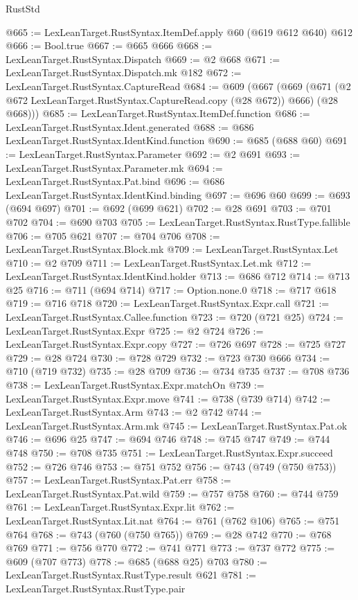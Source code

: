 \begin{lexlean}{RustStd}
\begin{coremodule}
@665 := LexLeanTarget.RustSyntax.ItemDef.apply @60 (@619 @612 @640) @612
@666 := Bool.true
@667 := @665 @666
@668 := LexLeanTarget.RustSyntax.Dispatch
@669 := @2 @668
@671 := LexLeanTarget.RustSyntax.Dispatch.mk @182
@672 := LexLeanTarget.RustSyntax.CaptureRead
@684 := @609
    (@667
      (@669 (@671 (@2 @672 LexLeanTarget.RustSyntax.CaptureRead.copy (@28 @672)) @666) (@28 @668)))
@685 := LexLeanTarget.RustSyntax.ItemDef.function
@686 := LexLeanTarget.RustSyntax.Ident.generated
@688 := @686 LexLeanTarget.RustSyntax.IdentKind.function
@690 := @685 (@688 @60)
@691 := LexLeanTarget.RustSyntax.Parameter
@692 := @2 @691
@693 := LexLeanTarget.RustSyntax.Parameter.mk
@694 := LexLeanTarget.RustSyntax.Pat.bind
@696 := @686 LexLeanTarget.RustSyntax.IdentKind.binding
@697 := @696 @60
@699 := @693 (@694 @697)
@701 := @692 (@699 @621)
@702 := @28 @691
@703 := @701 @702
@704 := @690 @703
@705 := LexLeanTarget.RustSyntax.RustType.fallible
@706 := @705 @621
@707 := @704 @706
@708 := LexLeanTarget.RustSyntax.Block.mk
@709 := LexLeanTarget.RustSyntax.Let
@710 := @2 @709
@711 := LexLeanTarget.RustSyntax.Let.mk
@712 := LexLeanTarget.RustSyntax.IdentKind.holder
@713 := @686 @712
@714 := @713 @25
@716 := @711 (@694 @714)
@717 := Option.none.{0}
@718 := @717 @618
@719 := @716 @718
@720 := LexLeanTarget.RustSyntax.Expr.call
@721 := LexLeanTarget.RustSyntax.Callee.function
@723 := @720 (@721 @25)
@724 := LexLeanTarget.RustSyntax.Expr
@725 := @2 @724
@726 := LexLeanTarget.RustSyntax.Expr.copy
@727 := @726 @697
@728 := @725 @727
@729 := @28 @724
@730 := @728 @729
@732 := @723 @730 @666
@734 := @710 (@719 @732)
@735 := @28 @709
@736 := @734 @735
@737 := @708 @736
@738 := LexLeanTarget.RustSyntax.Expr.matchOn
@739 := LexLeanTarget.RustSyntax.Expr.move
@741 := @738 (@739 @714)
@742 := LexLeanTarget.RustSyntax.Arm
@743 := @2 @742
@744 := LexLeanTarget.RustSyntax.Arm.mk
@745 := LexLeanTarget.RustSyntax.Pat.ok
@746 := @696 @25
@747 := @694 @746
@748 := @745 @747
@749 := @744 @748
@750 := @708 @735
@751 := LexLeanTarget.RustSyntax.Expr.succeed
@752 := @726 @746
@753 := @751 @752
@756 := @743 (@749 (@750 @753))
@757 := LexLeanTarget.RustSyntax.Pat.err
@758 := LexLeanTarget.RustSyntax.Pat.wild
@759 := @757 @758
@760 := @744 @759
@761 := LexLeanTarget.RustSyntax.Expr.lit
@762 := LexLeanTarget.RustSyntax.Lit.nat
@764 := @761 (@762 @106)
@765 := @751 @764
@768 := @743 (@760 (@750 @765))
@769 := @28 @742
@770 := @768 @769
@771 := @756 @770
@772 := @741 @771
@773 := @737 @772
@775 := @609 (@707 @773)
@778 := @685 (@688 @25) @703
@780 := LexLeanTarget.RustSyntax.RustType.result @621
@781 := LexLeanTarget.RustSyntax.RustType.pair

\end{coremodule}
\end{lexlean}
